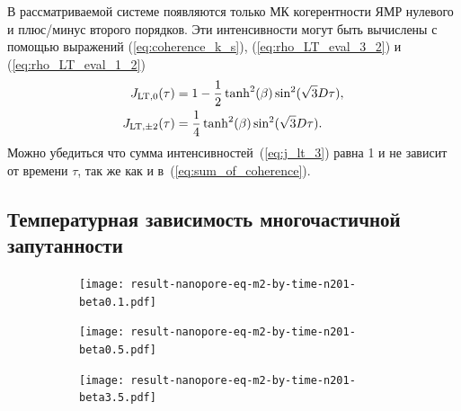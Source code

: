 В рассматриваемой системе появляются только МК когерентности ЯМР нулевого и плюс/минус второго порядков.
Эти интенсивности могут быть вычислены с помощью выражений
(\ref{eq:coherence_k_s}), (\ref{eq:rho_LT_eval_3_2}) и (\ref{eq:rho_LT_eval_1_2})
%
\begin{align}\label{eq:j_lt_3}
  J_{\mathrm{LT}, 0}(\tau) & = 1 - \frac 1 2 \tanh^2(\beta)\sin^2(\sqrt 3 D \tau), \notag \\
  J_{\mathrm{LT},\pm 2}(\tau) & = \frac 1 4 \tanh^2(\beta)\sin^2(\sqrt 3 D \tau).
\end{align}
%
Можно убедиться что сумма интенсивностей~(\ref{eq:j_lt_3}) равна 1
и не зависит от времени $\tau$, так же как и в~(\ref{eq:sum_of_coherence}).


\subsection{Температурная зависимость многочастичной запутанности}
\label{sec:entanglement}

\begin{figure}[h]
  \centering
  \begin{subfigure}[t]{0.31\textwidth}
    \centering
    \texttt{[image: result-nanopore-eq-m2-by-time-n201-beta0.1.pdf]}
    \caption{\protect}
    \label{fig:result-nanopore-eq-m2-by-time-beta0.1}
  \end{subfigure}
  \hfill
  \begin{subfigure}[t]{0.32\textwidth}
    \centering
    \texttt{[image: result-nanopore-eq-m2-by-time-n201-beta0.5.pdf]}
    \caption{\protect}
    \label{fig:result-nanopore-eq-m2-by-time-beta0.5}
  \end{subfigure}
  \hfill
  \begin{subfigure}[t]{0.34\textwidth}
    \centering
    \texttt{[image: result-nanopore-eq-m2-by-time-n201-beta3.5.pdf]}
    \caption{\protect}
    \label{fig:result-nanopore-eq-m2-by-time-beta3.5}
  \end{subfigure}
  \caption{\protect}
  \label{fig:result-nanopore-eq-m2-by-time-betas}
\end{figure}

